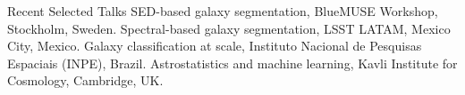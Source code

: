 \begin{rubric}{Recent Selected Talks}
\entry*[2026] SED-based galaxy segmentation, BlueMUSE Workshop, Stockholm, Sweden.
%
\entry*[2025] Spectral-based galaxy segmentation, LSST LATAM, Mexico City, Mexico.
%
\entry*[2024] Galaxy classification at scale, Instituto Nacional de Pesquisas Espaciais (INPE), Brazil.
%
\entry*[2023] Astrostatistics and machine learning, Kavli Institute for Cosmology, Cambridge, UK.
\end{rubric}




